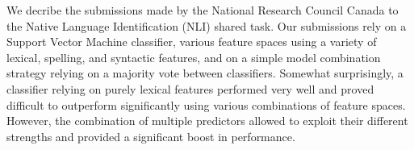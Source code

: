 We decribe the submissions made by the National Research Council   Canada to the Native Language Identification (NLI) shared task.  Our
   submissions rely on a Support Vector Machine classifier, various
   feature spaces using a variety of lexical, spelling, and syntactic
   features, and on a simple model combination strategy relying on a
   majority vote between classifiers.  Somewhat surprisingly, a
   classifier relying on purely lexical features performed very well
   and proved difficult to outperform significantly using various
   combinations of feature spaces. However, the combination of multiple
   predictors allowed to exploit their different strengths and provided
   a significant boost in performance.

